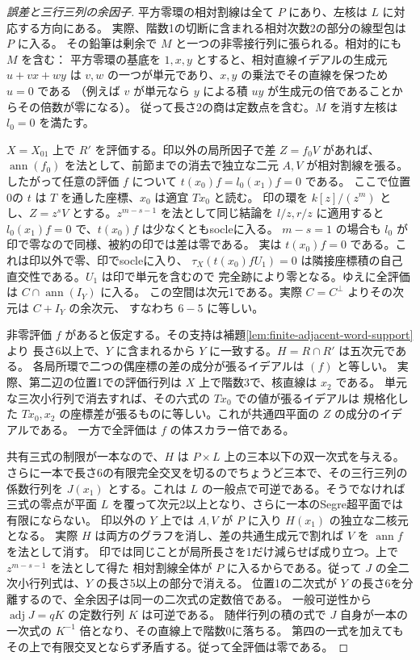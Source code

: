 \begin{proof}[誤差と三行三列の余因子]
平方零環の相対割線は全て $P$ にあり、左核は $L$ に対応する方向にある。
実際、階数1の切断に含まれる相対次数2の部分の線型包は $P$ に入る。
その鉛筆は剰余で $M$ と一つの非零接行列に張られる。相対的にも $M$ を含む：
平方零環の基底を $1,x,y$ とすると、相対直線イデアルの生成元
$u+vx+wy$ は $v,w$ の一つが単元であり、$x,y$ の乗法でその直線を保つため $u=0$ である
（例えば $v$ が単元なら $y$ による積 $uy$ が生成元の倍であることからその倍数が零になる）。
従って長さ2の商は定数点を含む。$M$ を消す左核は $l_0=0$ を満たす。

$X=X_{01}$ 上で $R'$ を評価する。印以外の局所因子で差 $Z=f_0 V$ があれば、
$\operatorname{ann}(f_0)$ を法として、前節までの消去で独立な二元 $A,V$ が相対割線を張る。
したがって任意の評価 $f$ について $t(x_0) f=l_0(x_1) f=0$ である。
ここで位置0の $t$ は $T$ を通した座標、$x_0$ は適宜 $T x_0$ と読む。
印の環を $k[z]/(z^m)$ とし、$Z=z^s V$ とする。$z^{m-s-1}$ を法として同じ結論を
$l/z,r/z$ に適用すると $l_0(x_1) f=0$ で、$t(x_0) f$ は少なくともsocleに入る。
$m-s=1$ の場合も $l_0$ が印で零なので同様、被約の印では差は零である。
実は $t(x_0) f=0$ である。これは印以外で零、印でsocleに入り、
$\tau_X(t(x_0) f U_1)=0$ は隣接座標積の自己直交性である。$U_1$ は印で単元を含むので
完全跡により零となる。ゆえに全評価は $C\cap\operatorname{ann}(I_Y)$ に入る。
この空間は次元1である。実際 $C=C^\perp$ よりその次元は $C+I_Y$ の余次元、
すなわち $6-5$ に等しい。

非零評価 $f$ があると仮定する。その支持は補題\ref{lem:finite-adjacent-word-support}より
長さ6以上で、$Y$ に含まれるから $Y$ に一致する。$H=R\cap R'$ は五次元である。
各局所環で二つの偶座標の差の成分が張るイデアルは $(f)$ と等しい。
実際、第二辺の位置1での評価行列は $X$ 上で階数3で、核直線は $x_2$ である。
単元な三次小行列で消去すれば、その六式の $T x_0$ での値が張るイデアルは
規格化した $T x_0,x_2$ の座標差が張るものに等しい。これが共通四平面の $Z$ の成分のイデアルである。
一方で全評価は $f$ の体スカラー倍である。

共有三式の制限が一本なので、$H$ は $P\times L$ 上の三本以下の双一次式を与える。
さらに一本で長さ6の有限完全交叉を切るのでちょうど三本で、その三行三列の係数行列を
$J(x_1)$ とする。これは $L$ の一般点で可逆である。そうでなければ三式の零点が平面 $L$
を覆って次元2以上となり、さらに一本のSegre超平面では有限にならない。
印以外の $Y$ 上では $A,V$ が $P$ に入り $H(x_1)$ の独立な二核元となる。
実際 $H$ は両方のグラフを消し、差の共通生成元で割れば $V$ を $\operatorname{ann} f$ を法として消す。
印では同じことが局所長さを1だけ減らせば成り立つ。上で $z^{m-s-1}$ を法として得た
相対割線全体が $P$ に入るからである。従って $J$ の全二次小行列式は、$Y$ の長さ5以上の部分で消える。
位置1の二次式が $Y$ の長さ6を分離するので、全余因子は同一の二次式の定数倍である。
一般可逆性から $\operatorname{adj}J=qK$ の定数行列 $K$ は可逆である。
随伴行列の積の式で $J$ 自身が一本の一次式の $K^{-1}$ 倍となり、その直線上で階数0に落ちる。
第四の一式を加えてもその上で有限交叉とならず矛盾する。従って全評価は零である。
\end{proof}
